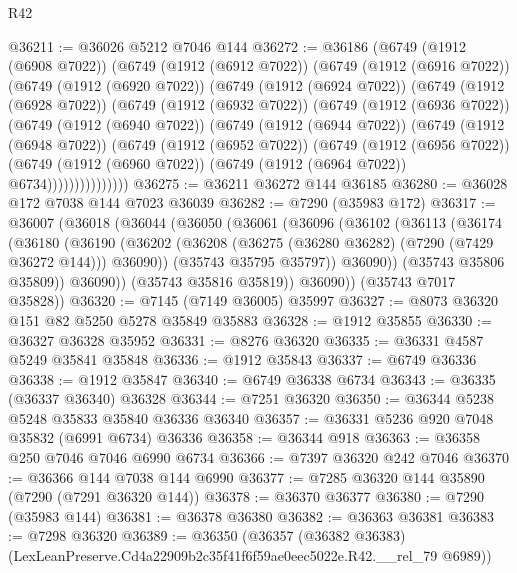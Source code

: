 \begin{lexlean}{R42}
\begin{coremodule}
{@36211 := @36026 @5212 @7046 @144
@36272 := @36186
    (@6749
      (@1912 (@6908 @7022))
      (@6749
        (@1912 (@6912 @7022))
        (@6749
          (@1912 (@6916 @7022))
          (@6749
            (@1912 (@6920 @7022))
            (@6749
              (@1912 (@6924 @7022))
              (@6749
                (@1912 (@6928 @7022))
                (@6749
                  (@1912 (@6932 @7022))
                  (@6749
                    (@1912 (@6936 @7022))
                    (@6749
                      (@1912 (@6940 @7022))
                      (@6749
                        (@1912 (@6944 @7022))
                        (@6749
                          (@1912 (@6948 @7022))
                          (@6749
                            (@1912 (@6952 @7022))
                            (@6749
                              (@1912 (@6956 @7022))
                              (@6749
                                (@1912 (@6960 @7022))
                                (@6749 (@1912 (@6964 @7022)) @6734)))))))))))))))
@36275 := @36211 @36272 @144 @36185
@36280 := @36028 @172 @7038 @144 @7023 @36039
@36282 := @7290 (@35983 @172)
@36317 := @36007
    (@36018
      (@36044
        (@36050
          (@36061
            (@36096
              (@36102
                (@36113
                  (@36174
                    (@36180
                      (@36190
                        (@36202
                          (@36208 (@36275 (@36280 @36282) (@7290 (@7429 @36272 @144))) @36090))
                        (@35743 @35795 @35797))
                      @36090))
                  (@35743 @35806 @35809))
                @36090))
            (@35743 @35816 @35819))
          @36090))
      (@35743 @7017 @35828))
@36320 := @7145 (@7149 @36005) @35997
@36327 := @8073 @36320 @151 @82 @5250 @5278 @35849 @35883
@36328 := @1912 @35855
@36330 := @36327 @36328 @35952
@36331 := @8276 @36320
@36335 := @36331 @4587 @5249 @35841 @35848
@36336 := @1912 @35843
@36337 := @6749 @36336
@36338 := @1912 @35847
@36340 := @6749 @36338 @6734
@36343 := @36335 (@36337 @36340) @36328
@36344 := @7251 @36320
@36350 := @36344 @5238 @5248 @35833 @35840 @36336 @36340
@36357 := @36331 @5236 @920 @7048 @35832 (@6991 @6734) @36336
@36358 := @36344 @918
@36363 := @36358 @250 @7046 @7046 @6990 @6734
@36366 := @7397 @36320 @242 @7046
@36370 := @36366 @144 @7038 @144 @6990
@36377 := @7285 @36320 @144 @35890 (@7290 (@7291 @36320 @144))
@36378 := @36370 @36377
@36380 := @7290 (@35983 @144)
@36381 := @36378 @36380
@36382 := @36363 @36381
@36383 := @7298 @36320
@36389 := @36350
    (@36357 (@36382 @36383) (LexLeanPreserve.Cd4a22909b2c35f41f6f59ae0eec5022e.R42.__rel_79 @6989))
}
\end{coremodule}
\end{lexlean}
